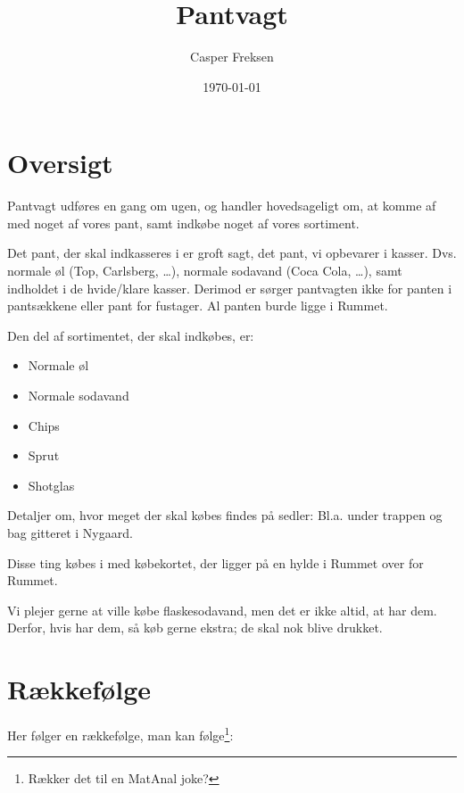 

\title{Pantvagt}
\date{\today}
\author{Casper Freksen}



\maketitle

\section{Oversigt}
\label{sec:oversigt}

Pantvagt udføres en gang om ugen, og handler hovedsageligt om, at
komme af med noget af vores pant, samt indkøbe noget af vores
sortiment.

Det pant, der skal indkasseres i \fotex er groft sagt, det pant, vi
opbevarer i kasser. Dvs. normale øl (Top, Carlsberg, \dots), normale
sodavand (Coca Cola, \dots), samt indholdet i de hvide/klare
kasser. Derimod er sørger pantvagten ikke for panten i pantsækkene
eller pant for fustager. Al panten burde ligge i Rummet.

Den del af sortimentet, der skal indkøbes, er:
\begin{itemize}
\item Normale øl
\item Normale sodavand
\item Chips
\item Sprut
\item Shotglas
\end{itemize}
Detaljer om, hvor meget der skal købes findes på sedler: Bl.a. under
trappen og bag gitteret i Nygaard.

Disse ting købes i \fotex med købekortet, der ligger på en hylde i
Rummet over for Rummet.

Vi plejer gerne at ville købe flaskesodavand, men det er ikke altid,
at \fotex har dem. Derfor, hvis \fotex har dem, så køb gerne ekstra; de
skal nok blive drukket.

\section{Rækkefølge}
\label{sec:rakkefolge}

Her følger en rækkefølge, man kan følge\footnote{Rækker det til en MatAnal joke?}:

